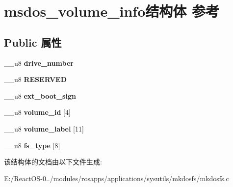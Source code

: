 \hypertarget{structmsdos__volume__info}{}\section{msdos\+\_\+volume\+\_\+info结构体 参考}
\label{structmsdos__volume__info}
\subsection*{Public 属性}
\begin{DoxyCompactItemize}
\item 
\mbox{\label{structmsdos__volume__info_a1217106dec438ad661490f393ddc7ae0}} 
\+\_\+\+\_\+u8 {\bfseries drive\+\_\+number}
\item 
\mbox{\label{structmsdos__volume__info_ae6f7653c45169bc707847e9a46ef63d8}} 
\+\_\+\+\_\+u8 {\bfseries R\+E\+S\+E\+R\+V\+ED}
\item 
\mbox{\label{structmsdos__volume__info_af092c9e7d945ce187a695d4c17500adc}} 
\+\_\+\+\_\+u8 {\bfseries ext\+\_\+boot\+\_\+sign}
\item 
\mbox{\label{structmsdos__volume__info_a978470e377431a28a5a62f9616f5b7fc}} 
\+\_\+\+\_\+u8 {\bfseries volume\+\_\+id} \mbox{[}4\mbox{]}
\item 
\mbox{\label{structmsdos__volume__info_a0b40db3f9f5d81369edc952f70a957a5}} 
\+\_\+\+\_\+u8 {\bfseries volume\+\_\+label} \mbox{[}11\mbox{]}
\item 
\mbox{\label{structmsdos__volume__info_ab8429d674a349d79635fcaf9fadcff65}} 
\+\_\+\+\_\+u8 {\bfseries fs\+\_\+type} \mbox{[}8\mbox{]}
\end{DoxyCompactItemize}


该结构体的文档由以下文件生成\+:\begin{DoxyCompactItemize}
\item 
E\+:/\+React\+O\+S-\/0../modules/rosapps/applications/sysutils/mkdosfs/mkdosfs.\+c\end{DoxyCompactItemize}
